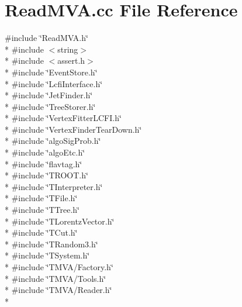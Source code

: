 \section{Read\-M\-V\-A.\-cc File Reference}
\label{ReadMVA_8cc}
{\ttfamily \#include \char`\"{}Read\-M\-V\-A.\-h\char`\"{}}\\*
{\ttfamily \#include $<$string$>$}\\*
{\ttfamily \#include $<$assert.\-h$>$}\\*
{\ttfamily \#include \char`\"{}Event\-Store.\-h\char`\"{}}\\*
{\ttfamily \#include \char`\"{}Lcfi\-Interface.\-h\char`\"{}}\\*
{\ttfamily \#include \char`\"{}Jet\-Finder.\-h\char`\"{}}\\*
{\ttfamily \#include \char`\"{}Tree\-Storer.\-h\char`\"{}}\\*
{\ttfamily \#include \char`\"{}Vertex\-Fitter\-L\-C\-F\-I.\-h\char`\"{}}\\*
{\ttfamily \#include \char`\"{}Vertex\-Finder\-Tear\-Down.\-h\char`\"{}}\\*
{\ttfamily \#include \char`\"{}algo\-Sig\-Prob.\-h\char`\"{}}\\*
{\ttfamily \#include \char`\"{}algo\-Etc.\-h\char`\"{}}\\*
{\ttfamily \#include \char`\"{}flavtag.\-h\char`\"{}}\\*
{\ttfamily \#include \char`\"{}T\-R\-O\-O\-T.\-h\char`\"{}}\\*
{\ttfamily \#include \char`\"{}T\-Interpreter.\-h\char`\"{}}\\*
{\ttfamily \#include \char`\"{}T\-File.\-h\char`\"{}}\\*
{\ttfamily \#include \char`\"{}T\-Tree.\-h\char`\"{}}\\*
{\ttfamily \#include \char`\"{}T\-Lorentz\-Vector.\-h\char`\"{}}\\*
{\ttfamily \#include \char`\"{}T\-Cut.\-h\char`\"{}}\\*
{\ttfamily \#include \char`\"{}T\-Random3.\-h\char`\"{}}\\*
{\ttfamily \#include \char`\"{}T\-System.\-h\char`\"{}}\\*
{\ttfamily \#include \char`\"{}T\-M\-V\-A/\-Factory.\-h\char`\"{}}\\*
{\ttfamily \#include \char`\"{}T\-M\-V\-A/\-Tools.\-h\char`\"{}}\\*
{\ttfamily \#include \char`\"{}T\-M\-V\-A/\-Reader.\-h\char`\"{}}\\*

